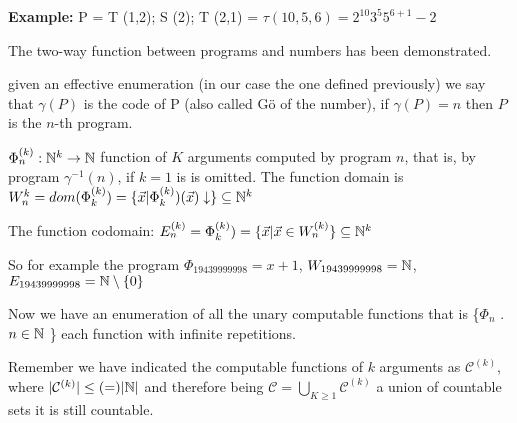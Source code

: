 \textbf{Example:} P = T (1,2); S (2); T (2,1) = $ \tau(10,5,6) = 2^{10} 3^5 5^{6+1} -2 $

The two-way function between programs and numbers has been demonstrated.

\begin{notation} given an effective enumeration (in our case the one defined previously) we say that $ \gamma(P) $ is the code of P (also called G\"{o} of the number), if $ \gamma(P) = n $ then $P$ is the $n$-th program.
\end{notation}

\begin{notation} $ \Phi_n^{(k)}: \mathbb{N}^k\rightarrow\mathbb{N} $ function of $K$ arguments computed by program $n$, that is, by program $ \gamma^{-1}(n) $, if $k = 1$ is is omitted. The function domain  is $ W_n^{k} = dom(\Phi_k^{(k)}) = \{\vec{x} | \Phi_k^{(k)})(\vec{x})\downarrow  \} \subseteq \mathbb{N}^k$

  The function codomain: $ E^{(k)}_n = \Phi_k^{(k)}) = \{\vec{x} | \vec{x} \in W_n^{(k)} \} \subseteq \mathbb{N}^k$
\end{notation}

So for example the program $ \Phi_{19439999998} = x+1 $, $ W_{19439999998} = \mathbb{N} $, $ E_{19439999998} = \mathbb{N} \setminus \{0\} $

Now we have an enumeration of all the unary computable functions that is \{$ \Phi_n $ . $ n \in \mathbb{N} $ \} each function with infinite repetitions.

Remember we have indicated the computable functions of $k$ arguments as $ \mathcal{C} ^ {(k)} $, where $ | \mathcal{C} ^ {(k)} | \leq (=) | \mathbb{N} | $ and therefore being $ \mathcal{C} = \bigcup_{K \geq 1} \mathcal{C} ^ {(k)} $ a union of countable sets it is still countable.
